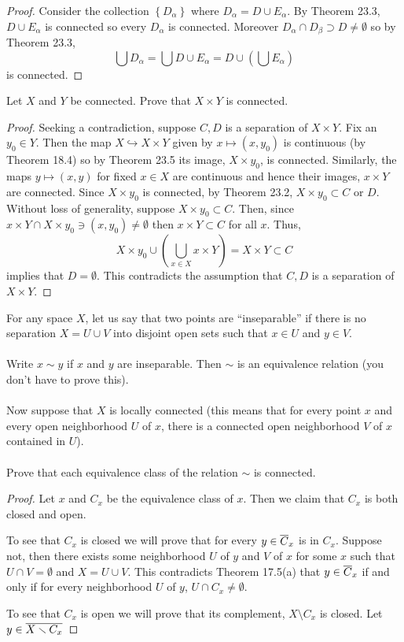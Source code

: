 \begin{proof}
Consider the collection $\left\{D_\alpha\right\}$ where
$D_\alpha=D\cup E_\alpha$. By Theorem 23.3, $D\cup E_\alpha$ is
connected so every $D_\alpha$ is connected. Moreover
$D_\alpha\cap D_\beta\supset D\neq\emptyset$ so by Theorem 23.3,
\[
\bigcup D_\alpha=\bigcup D\cup E_\alpha=D\cup\left(\bigcup E_\alpha\right)
\]
is connected.
\end{proof}
\begin{problem}
Let $X$ and $Y$ be connected. Prove that $X\times Y$ is connected.
\end{problem}
\begin{proof}
Seeking a contradiction, suppose $C,D$ is a separation of
$X\times Y$. Fix an $y_0\in Y$. Then the map
$X\hookrightarrow X\times Y$ given by $x\mapsto (x,y_0)$ is
continuous (by Theorem 18.4) so by Theorem 23.5 its image,
$X\times y_0$, is connected. Similarly, the maps $y\mapsto
(x,y)$ for fixed $x\in X$ are continuous and hence their images,
$x\times Y$ are connected. Since $X\times y_0$ is connected, by
Theorem 23.2, $X\times y_0\subset C$ or $D$. Without loss of
generality, suppose $X\times y_0\subset C$. Then, since $x\times
Y\cap X\times y_0\ni (x,y_0)\neq\emptyset$ then $x\times Y\subset
C$ for all $x$. Thus,
\[
X\times y_0\cup\left(\bigcup_{x\in X}x\times Y\right)=X\times
Y\subset C
\]
implies that $D=\emptyset$. This contradicts the assumption
that $C,D$ is a separation of $X\times Y$.
\end{proof}
\begin{problem}
For any space $X$, let us say that two points are ``inseparable''
if there is no separation $X=U\cup V$ into disjoint open sets
such that $x\in U$ and $y\in V$.
\\\\
Write $x\sim y$ if $x$ and $y$
are inseparable. Then $\sim$ is an equivalence relation (you
don't have to prove this).
\\\\
Now suppose that $X$ is locally connected (this means that for
every point $x$ and every open neighborhood $U$ of $x$, there is
a connected open neighborhood $V$ of $x$ contained in $U$).
\\\\
Prove that each equivalence class of the relation $\sim$ is connected.
\end{problem}
\begin{proof}
Let $x$ and $C_x$ be the equivalence class of $x$. Then we claim
that $C_x$ is both closed and open.

To see that $C_x$ is closed we will prove that for every
$y\in\overline{C}_x$ is in $C_x$. Suppose not, then there exists some
neighborhood $U$ of $y$ and $V$ of $x$ for some $x$ such that
$U\cap V=\emptyset$ and $X=U\cup V$. This contradicts Theorem
17.5(a) that $y\in\overline{C}_x$ if and only if for every
neighborhood $U$ of $y$, $U\cap C_x\neq\emptyset$.

To see that $C_x$ is open we will prove that its complement,
$X\setminus C_x$ is closed. Let $y\in\overline{X\smallsetminus C_x}$
\end{proof}
